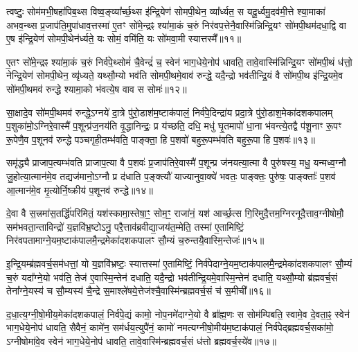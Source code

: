 त्वष्टुः॒ सोम॑मभी॒षहा॑पिब॒थ्स विष्व॒ङ्व्या᳚र्च्छ॒थ्स इ॑न्द्रि॒येण॑ सोमपी॒थेन॒ व्या᳚र्ध्यत॒ स यदू॒र्ध्वमु॒दव॑मी॒त्ते श्या॒माका॑ अभव॒न्थ्स प्र॒जाप॑ति॒मुपा॑धाव॒त्तस्मा॑ ए॒तꣳ सो॑मे॒न्द्रꣴ श्या॑मा॒कं च॒रुं निर॑वप॒त्तेनै॒वास्मि॑न्निन्द्रि॒यꣳ सो॑मपी॒थम॑दधा॒द्वि वा ए॒ष इ॑न्द्रि॒येण॑ सोमपी॒थेन॑र्ध्यते॒ यः सोमं॒ वमि॑ति॒ यः सो॑मवा॒मी स्यात्तस्मै᳚॥११॥

ए॒तꣳ सो॑मे॒न्द्रꣴ श्या॑मा॒कं च॒रुं निर्व॑पे॒थ्सोमं॑ चै॒वेन्द्रं॑ च॒ स्वेन॑ भाग॒धेये॒नोप॑ धावति॒ तावे॒वास्मि॑न्निन्द्रि॒यꣳ सो॑मपी॒थं ध॑त्तो॒ नेन्द्रि॒येण॑ सोमपी॒थेन॒ व्यृ॑ध्यते॒ यथ्सौ॒म्यो भव॑ति सोमपी॒थमे॒वाव॑ रुन्द्धे॒ यदै॒न्द्रो भव॑तीन्द्रि॒यं वै सो॑मपी॒थ इ॑न्द्रि॒यमे॒व सो॑मपी॒थमव॑ रुन्द्धे श्यामा॒को भ॑वत्ये॒ष वाव स सोमः॑॥१२॥

सा॒क्षादे॒व सो॑मपी॒थमव॑ रुन्द्धे॒\-ऽग्नये॑ दा॒त्रे पु॑रो॒डाश॑म॒ष्टाक॑पालं॒ निर्व॑पे॒दिन्द्रा॑य प्रदा॒त्रे पु॑रो॒डाश॒मेका॑दशकपालम् प॒शुका॑मो॒\-ऽग्निरे॒वास्मै॑ प॒शून्प्र॑ज॒नय॑ति वृ॒द्धानिन्द्रः॒ प्र य॑च्छति॒ दधि॒ मधु॑ घृ॒तमापो॑ धा॒ना भ॑वन्त्ये॒तद्वै प॑शू॒नाꣳ रू॒पꣳ रू॒पेणै॒व प॒शूनव॑ रुन्द्धे पञ्चगृही॒तम्भ॑वति॒ पाङ्क्ता॒ हि प॒शवो॑ बहुरू॒पम्भ॑वति बहुरू॒पा हि प॒शवः॑॥१३॥

समृ॑द्ध्यै प्राजाप॒त्यम्भ॑वति प्राजाप॒त्या वै प॒शवः॑ प्र॒जाप॑तिरे॒वास्मै॑ प॒शून्प्र ज॑नयत्या॒त्मा वै पुरु॑षस्य॒ मधु॒ यन्मध्व॒ग्नौ जु॒होत्या॒त्मान॑मे॒व तद्यज॑मानो॒\-ऽग्नौ प्र द॑धाति प॒ङ्क्त्यौ॑ याज्यानुवा॒क्ये॑ भवतः॒ पाङ्क्तः॒ पुरु॑षः॒ पाङ्क्ताः᳚ प॒शव॑ आ॒त्मान॑मे॒व मृ॒त्योर्नि॒ष्क्रीय॑ प॒शूनव॑ रुन्द्धे॥१४॥

{\anuvakamend[{इ॒न्द्रि॒ये᳚\-ऽस्मि॒न्भूम्या॑ ए॒तामिन्द्रः॒ स्यात्तस्मै॒ सोमो॑ बहुरू॒पा हि प॒शव॒ एक॑चत्वारिꣳशच्च॥२॥}]}

दे॒वा वै स॒त्त्रमा॑स॒तर्द्धि॑परिमितं॒ यश॑स्कामा॒स्तेषा॒ꣳ॒ सोम॒ꣳ॒ राजा॑नं॒ यश॑ आर्च्छ॒त्स गि॒रिमुदै॒त्तम॒ग्निरनूदै॒त्ताव॒ग्नीषोमौ॒ सम॑भवता॒न्ताविन्द्रो॑ य॒ज्ञवि॑भ्र॒ष्टो\-ऽनु॒ परै॒त्ताव॑ब्रवीद्या॒जय॑त॒म्मेति॒ तस्मा॑ ए॒तामिष्टिं॒ निर॑वपतामाग्ने॒यम॒ष्टाक॑पालमै॒न्द्रमेका॑दशकपालꣳ सौ॒म्यं च॒रुन्तयै॒वास्मि॒न्तेजः॑॥१५॥

इ॒न्द्रि॒यम्ब्र॑ह्मवर्च॒सम॑धत्तां॒ यो य॒ज्ञवि॑भ्रष्टः॒ स्यात्तस्मा॑ ए॒तामिष्टिं॒ निर्व॑पेदाग्ने॒यम॒ष्टाक॑पालमै॒न्द्रमेका॑दशकपालꣳ सौ॒म्यं च॒रुं यदा᳚ग्ने॒यो भव॑ति॒ तेज॑ ए॒वास्मि॒न्तेन॑ दधाति॒ यदै॒न्द्रो भव॑तीन्द्रि॒यमे॒वास्मि॒न्तेन॑ दधाति॒ यथ्सौ॒म्यो ब्र॑ह्मवर्च॒सं तेना᳚ग्ने॒यस्य॑ च सौ॒म्यस्य॑ चै॒न्द्रे स॒माश्ले॑षये॒त्तेज॑श्चै॒वास्मि॑न्ब्रह्मवर्च॒सं च॑ स॒मीची᳚॥१६॥

द॒धा॒त्य॒ग्नी॒षो॒मीय॒मेका॑दशकपालं॒ निर्व॑पे॒द्यं कामो॒ नोप॒नमे॑दाग्ने॒यो वै ब्रा᳚ह्म॒णः स सोम॑म्पिबति॒ स्वामे॒व दे॒वता॒ꣴ॒ स्वेन॑ भाग॒धेये॒नोप॑ धावति॒ सैवैनं॒ कामे॑न॒ सम॑र्धय॒त्युपै॑नं॒ कामो॑ नमत्यग्नीषो॒मीय॑म॒ष्टाक॑पालं॒ निर्व॑पेद्ब्रह्मवर्च॒सका॑मो॒ \-ऽग्नीषोमा॑वे॒व स्वेन॑ भाग॒धेये॒नोप॑ धावति॒ तावे॒वास्मि॑न्ब्रह्मवर्च॒सं ध॑त्तो ब्रह्मवर्च॒स्ये॑व॥१७॥

